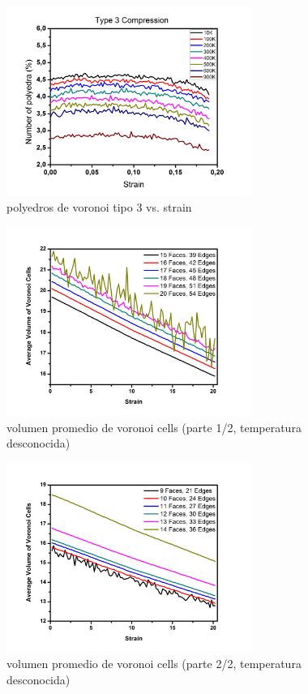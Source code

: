 \documentclass[10pt, oneside]{article} %
\begin{document}
\begin{figure}[H]
\centering
\includegraphics[width=8cm]{Figures/type3_COMP.png}
\caption{polyedros de voronoi tipo 3 vs. strain}
\end{figure}

\begin{figure}[H]
\centering
\includegraphics[width=8cm]{Figures/COMP_Vol_Step_A.png}
\caption{volumen promedio de voronoi cells (parte 1/2, temperatura desconocida)}
\end{figure}

\begin{figure}[H]
\centering
\includegraphics[width=8cm]{Figures/COMP_Vol_Step_B.png}
\caption{volumen promedio de voronoi cells (parte 2/2, temperatura desconocida)}
\end{figure}
\end{document}
